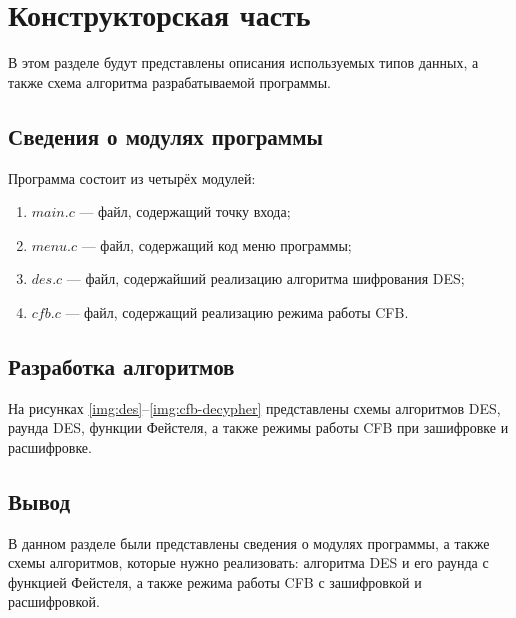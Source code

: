\chapter{Конструкторская часть}
В этом разделе будут представлены описания используемых типов данных, а также схема алгоритма разрабатываемой программы.

\section{Сведения о модулях программы}
Программа состоит из четырёх модулей:
\begin{enumerate}[label=\arabic*)]
	\item $main.c$ --- файл, содержащий точку входа;
    \item $menu.c$ --- файл, содержащий код меню программы;
    \item $des.c$ --- файл, содержайший реализацию алгоритма шифрования DES;
    \item $cfb.c$ --- файл, содержащий реализацию режима работы CFB.
\end{enumerate}

\section{Разработка алгоритмов}
На рисунках \ref{img:des}--\ref{img:cfb-decypher} представлены схемы алгоритмов DES, раунда DES, функции Фейстеля, а также режимы работы CFB при зашифровке и расшифровке.
\clearpage

\clearpage
{}

\section*{Вывод}

В данном разделе были представлены сведения о модулях программы, а также схемы алгоритмов, которые нужно реализовать: алгоритма DES и его раунда с функцией Фейстеля, а также режима работы CFB с зашифровкой и расшифровкой.
